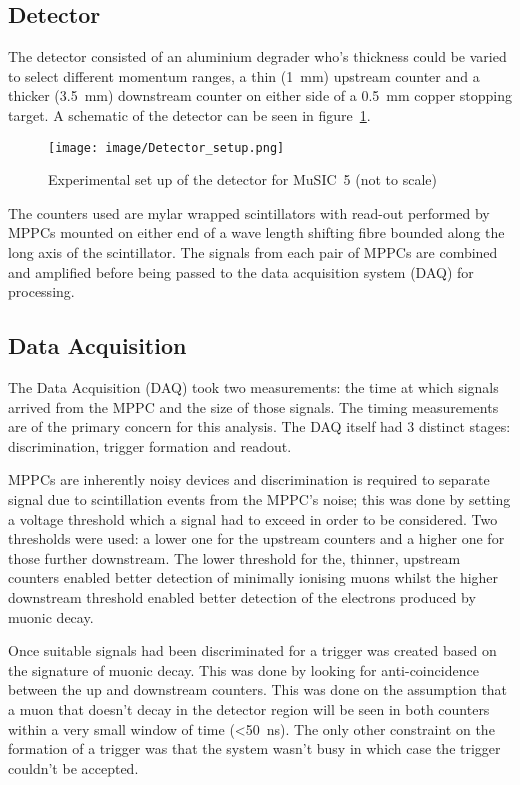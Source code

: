 \documentclass[]{article}
\begin{document}
\subsection{Detector} %
\label{sub:detector}
The detector consisted of an aluminium degrader who's thickness could be varied to select different momentum ranges, a thin (1~mm) upstream counter and a thicker (3.5~mm) downstream counter on either side of a 0.5~mm copper stopping target. A schematic of the detector can be seen in figure~\ref{fig:setup}.
\begin{figure}[htb]
	\centering
		\texttt{[image: image/Detector\_setup.png]}
	\caption{Experimental set up of the detector for MuSIC~5 (not to scale)}
	\label{fig:setup}
\end{figure}  

The counters used are mylar wrapped scintillators with read-out performed by MPPCs mounted on either end of a wave length shifting fibre bounded along the long axis of the scintillator. The signals from each pair of MPPCs are combined and amplified before being passed to the data acquisition system (DAQ) for processing. 

\subsection{Data Acquisition} %
\label{sub:data_acquisition}
The Data Acquisition (DAQ) took two measurements: the time at which signals arrived from the MPPC and the size of those signals. The timing measurements are of the primary concern for this analysis. The DAQ itself had 3 distinct stages: discrimination, trigger formation and readout.

MPPCs are inherently noisy devices and discrimination is required to separate signal due to scintillation events from the MPPC's noise; this was done by setting a voltage threshold which a signal had to exceed in order to be considered. Two thresholds were used: a lower one for the upstream counters and a higher one for those further downstream. The lower threshold for the, thinner, upstream counters enabled better detection of minimally ionising muons whilst the higher downstream threshold enabled better detection of the electrons produced by muonic decay. 

Once suitable signals had been discriminated for a trigger was created based on the signature of muonic decay. This was done by looking for anti-coincidence between the up and downstream counters. This was done on the assumption that a muon that doesn't decay in the detector region will be seen in both counters within a very small window of time (<50~ns). The only other constraint on the formation of a trigger was that the system wasn't busy in which case the trigger couldn't be accepted.
\end{document}
